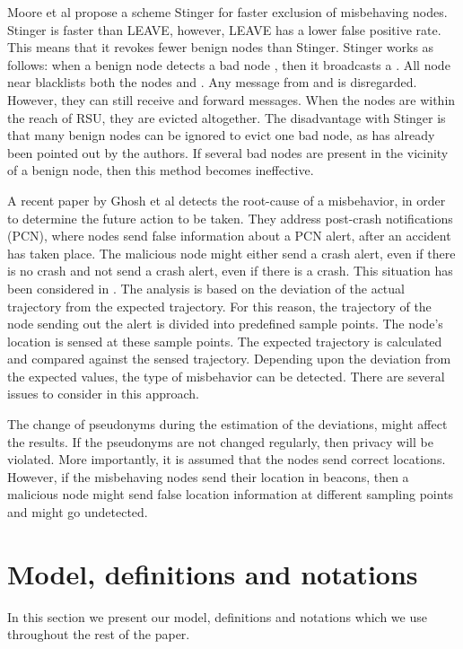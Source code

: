 \documentclass[conference]{IEEEtran}[10pt]
\begin{document}
Moore et al \cite{MRCPAH08} propose a scheme Stinger for faster exclusion of misbehaving nodes. 
Stinger is faster than LEAVE, however, LEAVE has a lower false positive rate. This means that
it revokes fewer benign nodes than Stinger. 
Stinger works as follows: when a benign node  detects a bad node , then it broadcasts a . 
All node near  blacklists both the nodes  and . Any message from  and  is disregarded. 
However, they can still receive and forward messages. 
When the nodes are within the reach of RSU, they are evicted altogether. 
The disadvantage with Stinger is that 
many benign nodes can be ignored to evict one bad node, as has already been pointed out by the authors. 
If several bad nodes are present in the vicinity of a benign node, then this method becomes ineffective. 

A recent paper by Ghosh et al \cite{GVGKM10} detects the root-cause of a misbehavior, in order to determine 
the future action to be taken. 
They address post-crash notifications (PCN), where nodes send false information about a PCN alert, after an accident has taken place.  
The malicious node might either send a crash alert, even if there is no crash and not send a crash alert, 
even if there is a crash.
This situation has been  considered in \cite{GVKG09}.  
The analysis is based on the deviation of the actual trajectory from the expected trajectory. 
For this reason, the trajectory of the node sending out the alert is divided into predefined sample points. 
The node's location is sensed at these sample points.
The expected trajectory is calculated and compared against the sensed trajectory. 
Depending upon the deviation from the expected values, the type of misbehavior can be detected. 
There are several issues to consider in this approach. 

The change of pseudonyms during the estimation of the deviations, might affect the results. 
If the pseudonyms are not changed regularly, then privacy will be violated. 
More importantly, it is assumed that the nodes send correct locations. 
However, if the misbehaving nodes send their location in beacons, then a malicious node might send false location information at different sampling points
and might go undetected. 



\section{Model, definitions and notations}
\label{sec:model_def_not}
In this section we present our model, definitions and notations which we use throughout the rest of the paper. 
\end{document}
